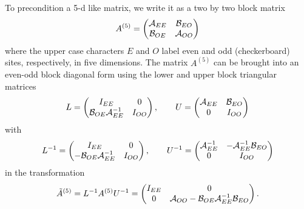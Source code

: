 \documentclass[12pt]{article}
\begin{document}
To precondition a 5-d like matrix, we write it as a two by two block matrix
\begin{eqnarray}
A^{(5)} = \begin{pmatrix} {\cal A}_{EE} & {\cal B}_{EO} \\
  {\cal B}_{OE} & {\cal A}_{OO} \end{pmatrix}
\end{eqnarray}
where the upper case characters $E$ and $O$ label even and odd
(checkerboard) sites, respectively, in five dimensions. The matrix
$A^{(5)}$ can be brought into an even-odd block diagonal form using
the lower and upper block triangular matrices
\begin{eqnarray}
L = \begin{pmatrix} I_{EE} & 0 \\ 
{\cal B}_{OE}{\cal A}_{EE}^{-1} & I_{OO} \end{pmatrix},
\qquad
U = \begin{pmatrix} {\cal A}_{EE} & {\cal B}_{EO}\\
0 & I_{OO} \end{pmatrix}
\end{eqnarray}
with
\begin{eqnarray}
L^{-1} = \begin{pmatrix} I_{EE} & 0 \\ 
-{\cal B}_{OE}{\cal A}_{EE}^{-1} & I_{OO} \end{pmatrix},
\qquad
U^{-1} = \begin{pmatrix} {\cal A}_{EE}^{-1} & -{\cal A}_{EE}^{-1}{\cal B}_{EO}\\
0 & I_{OO} \end{pmatrix}
\end{eqnarray}
in the transformation
\begin{eqnarray}
{\tilde A}^{(5)} = L^{-1} A^{(5)} U^{-1} = 
\begin{pmatrix} I_{EE} & 0 \\ 0 &
{\cal A}_{OO} - {\cal B}_{OE}{\cal A}_{EE}^{-1}{\cal B}_{EO}
\end{pmatrix}.
\end{eqnarray}
\end{document}
